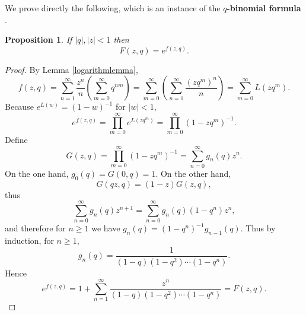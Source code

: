\documentclass{amsart}
\newtheorem{proposition}[theorem]{Proposition}
\begin{document}
We prove directly the following, which is an instance of the \textbf{$q$-binomial formula}  \cite[p.~17, Theorem 2.1]{andrews}.

\begin{proposition}
If $|q|, |z|<1$ then
\[
F(z,q) = e^{f(z,q)}.
\]
\label{qbinomial}
\end{proposition}
\begin{proof}
By Lemma \ref{logarithmlemma},
\[
f(z,q)=\sum_{n=1}^\infty \frac{z^n}{n} \left( \sum_{m=0}^\infty q^{nm}\right)
=\sum_{m=0}^\infty \left( \sum_{n=1}^\infty \frac{(zq^m)^n}{n} \right)
=\sum_{m=0}^\infty L(zq^m).
\]
Because $e^{L(w)}=(1-w)^{-1}$ for $|w|<1$,
\[
e^{f(z,q)} = \prod_{m=0}^\infty e^{L(zq^m)}
=\prod_{m=0}^\infty (1-zq^m)^{-1}.
\]
Define
\[
G(z,q) = \prod_{m=0}^\infty (1-zq^m)^{-1} = \sum_{n=0}^\infty g_n(q) z^n.
\]
On the one hand, $g_0(q) = G(0,q) = 1$. On the other hand,
\[
G(qz,q) = (1-z) G(z,q),
\]
thus
\[
\sum_{n=0}^\infty g_n(q) z^{n+1} = \sum_{n=0}^\infty g_n(q)(1-q^n) z^n,
\]
and therefore for $n \geq 1$ we have 
$g_n(q) = (1-q^n)^{-1} g_{n-1}(q)$. 
Thus by induction, for $n \geq 1$,
\[
g_n(q) = \frac{1}{(1-q)(1-q^2)\cdots (1-q^n)}.
\]
Hence
\[
e^{f(z,q)} = 1 + \sum_{n=1}^\infty  \frac{z^n}{(1-q)(1-q^2)\cdots (1-q^n)} = F(z,q).
\]
\end{proof}
\end{document}
